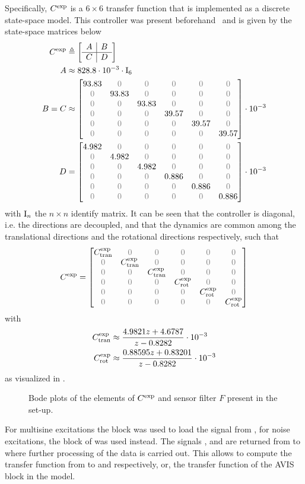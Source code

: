 Specifically, $C^{\mathrm{exp}}$ is a $6\times6$ transfer function that is implemented as a discrete state-space model.
This controller was present beforehand~\citep{Rademakers2005MSc,vanderMaas2011MSc} and is given by the state-space matrices below
\begin{align}
  \experimental\Controller & \isdef \stateSpace{A}{B}{C}{D}\\
  A       &\approx 828.8 \cdot 10^{-3} \cdot \Identity{6} \\
  B = C &\approx \AvisMatrixDiagonal{93.83}{39.57} \cdot 10^{-3}\\
  D       &= \AvisMatrixDiagonal{4.982}{0.886} \cdot 10^{-3}
\end{align}
with $\mathrm{I}_{n}$ the $n\times n$ identify matrix.
It can be seen that the controller is diagonal, i.e. the directions are decoupled, and that the dynamics are common among the translational directions and the rotational directions respectively, such that
\begin{equation}
  \experimental\Controller = 
  \AvisMatrixDiagonal{\experimental\Controller_{\mathrm{tran}}}{\experimental\Controller_{\mathrm{rot}}}
\end{equation}
with
\begin{align}
C^{\mathrm{exp}}_{\mathrm{tran}} &  \approx 
   \frac{4.9821 z + 4.6787}{ z - 0.8282} \cdot 10^{-3} \\
  C^{\mathrm{exp}}_{\mathrm{rot}} & \approx 
    \frac{0.88595 z + 0.83201}{ z - 0.8282} \cdot 10^{-3}
\end{align}
 as visualized in .

\begin{figure}
\setlength{}
\setlength\figureheight{0.68\figurewidth}

\caption{Bode plots of the elements of $C^{\mathrm{exp}}$ and sensor filter $F$ present in the set-up.}
\label{fig:avis:bodeplots:controllerAndSensor}
\end{figure}

For multisine excitations the  block was used to load the  signal from \MATLAB, for noise excitations, the  block of \Simulink was used instead.
The signals ,  and  are returned from \Simulink to \MATLAB where further processing of the data is carried out.
This allows to compute the transfer function from  to  and  respectively, or, the transfer function of the \gls{AVIS} block in the \Simulink model.

